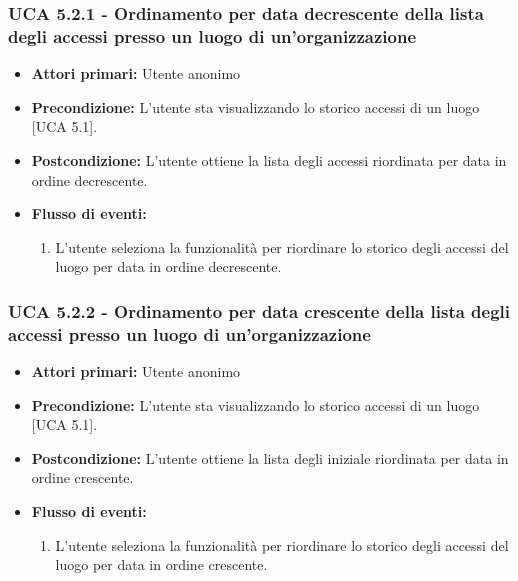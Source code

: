 \subsubsection{UCA 5.2.1 - Ordinamento per data decrescente della lista degli accessi presso un luogo di un'organizzazione}
\begin{itemize}
    \item \textbf{Attori primari:} Utente anonimo
    \item \textbf{Precondizione:} L'utente sta visualizzando lo storico accessi di un luogo [UCA 5.1].
    \item \textbf{Postcondizione:} L'utente ottiene la lista degli accessi riordinata per data in ordine decrescente.
    \item \textbf{Flusso di eventi:}
    \begin{enumerate}
        \item L'utente seleziona la funzionalità per riordinare lo storico degli accessi del luogo per data in ordine decrescente.
    \end{enumerate}
\end{itemize}

\subsubsection{UCA 5.2.2 - Ordinamento per data crescente della lista degli accessi presso un luogo di un'organizzazione}
\begin{itemize}
    \item \textbf{Attori primari:} Utente anonimo
    \item \textbf{Precondizione:} L'utente sta visualizzando lo storico accessi di un luogo [UCA 5.1].
    \item \textbf{Postcondizione:} L'utente ottiene la lista degli iniziale riordinata per data in ordine crescente.
    \item \textbf{Flusso di eventi:}
    \begin{enumerate}
        \item L'utente seleziona la funzionalità per riordinare lo storico degli accessi del luogo per data in ordine crescente.
    \end{enumerate}
\end{itemize}

